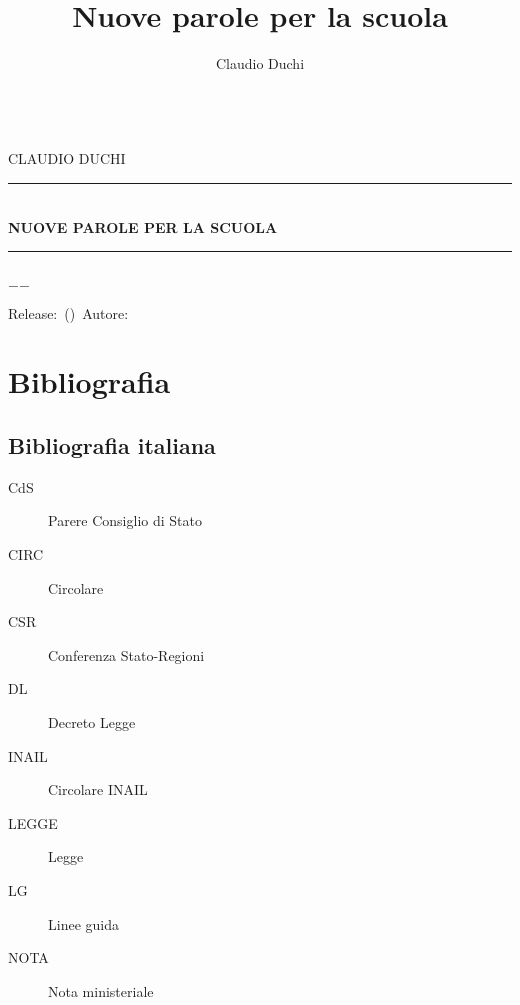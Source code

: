 \documentclass[a4paper]{book}%
\title{Nuove parole per la scuola}
\author{Claudio Duchi}
\date{\datetime}
\makeatletter
\newcommand{\HRule}{\rule{\linewidth}{0.5mm}}
\renewcommand\frontmatter{%
	\cleardoublepage
	\@mainmatterfalse
	\pagenumbering{arabic}}
\renewcommand\mainmatter{%
	\cleardoublepage
	\@mainmattertrue}
\makeatother
\begin{document}
\let\cleardoublepage\clearpage
	\pagestyle{fancy}
	\fncyfront
	\frontmatter
		\hypersetup{pageanchor=false}
		\begin{titlepage}\parindent=0pt
			\centering
	\begin{center}
	\Lgrandedue\\[1cm]
	\textsc{\trjnfamily\LARGE CLAUDIO DUCHI}\\[1.2cm]
	\HRule \\[0.4cm]
	{ \trjnfamily\huge \bfseries NUOVE PAROLE PER LA SCUOLA}\\[0.4cm]
	\HRule \\[1.2cm]
	\vfill
	{\large $-$\DTMnow$-$}	
\end{center}
{\centering
	Release:\gitReln\ (\gitAbbrevHash)\ Autore:\gitAuthorName\ 
	\gitCommitterDate \\
}
		\end{titlepage}
	\setcounter{page}{2}
		\CDcopyright
		\tableofcontents
			\listoftables
{}  %
			
	\fncymain
	\mainmatter
\cleardoublepage
\glsaddall	
\printglossaries
	
\nocite{*}



\chapter{Bibliografia}

 \section{Bibliografia italiana}
 \begin{description}
 	\item[CdS] Parere Consiglio di Stato
 	\item[CIRC] Circolare 
 	\item[CSR] Conferenza Stato-Regioni
 	\item[DL] Decreto Legge
 	\item[INAIL] Circolare INAIL
 	\item[LEGGE] Legge
 	\item[LG] Linee guida
 	\item[NOTA] Nota ministeriale
 \end{description}
\printbibliography[keyword=LEX,heading=subbibliography]
 
\end{document}
